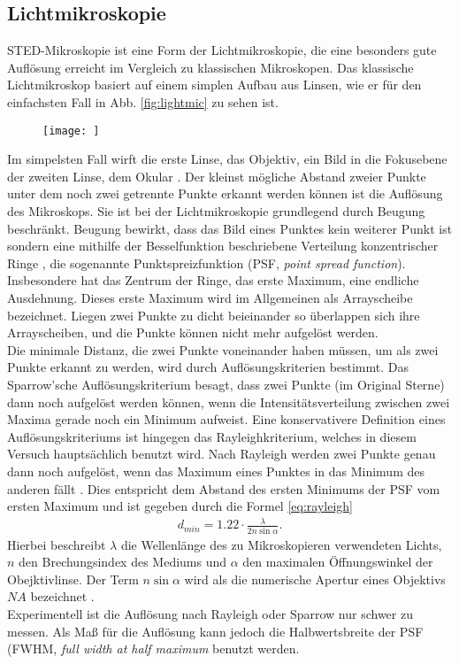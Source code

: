 \subsection{Lichtmikroskopie}
STED-Mikroskopie ist eine Form der Lichtmikroskopie, die eine besonders gute Auflösung erreicht im Vergleich zu klassischen Mikroskopen.
Das klassische Lichtmikroskop basiert auf einem simplen Aufbau aus Linsen, wie er für den einfachsten Fall in Abb. \ref{fig:lightmic} zu sehen ist.
\begin{figure}
	\centering
	\texttt{[image: ]}
\end{figure}
Im simpelsten Fall wirft die erste Linse, das Objektiv, ein Bild in die Fokusebene der zweiten Linse, dem Okular \cite{Dem2}.
Der kleinst mögliche Abstand zweier Punkte unter dem noch zwei getrennte Punkte erkannt werden können ist die Auflösung des Mikroskops.
Sie ist bei der Lichtmikroskopie grundlegend durch Beugung beschränkt.
Beugung bewirkt, dass das Bild eines Punktes kein weiterer Punkt ist sondern eine mithilfe der Besselfunktion beschriebene Verteilung konzentrischer Ringe \cite{Born}, die sogenannte Punktspreizfunktion (PSF, \emph{point spread function}).
Insbesondere hat das Zentrum der Ringe, das erste Maximum, eine endliche Ausdehnung.
Dieses erste Maximum wird im Allgemeinen als Arrayscheibe bezeichnet.
Liegen zwei Punkte zu dicht beieinander so überlappen sich ihre Arrayscheiben, und die Punkte können nicht mehr aufgelöst werden.\\
Die minimale Distanz, die zwei Punkte voneinander haben müssen, um als zwei Punkte erkannt zu werden, wird durch Auflösungskriterien bestimmt.
Das Sparrow'sche Auflösungskriterium \cite{sparrow} besagt, dass zwei Punkte (im Original Sterne) dann noch aufgelöst werden können, wenn die Intensitätsverteilung zwischen zwei Maxima gerade noch ein Minimum aufweist.
Eine konservativere Definition eines Auflösungskriteriums ist hingegen das Rayleighkriterium, welches in diesem Versuch hauptsächlich benutzt wird.
Nach Rayleigh werden zwei Punkte genau dann noch aufgelöst, wenn das Maximum eines Punktes in das Minimum des anderen fällt \cite{Dem2}.
Dies entspricht dem Abstand des ersten Minimums der PSF vom ersten Maximum und ist gegeben durch die Formel \ref{eq:rayleigh}
\begin{align}
	d_{min} = 1.22\cdot \frac{\lambda}{2n\sin \alpha}. \label{eq:rayleigh}
\end{align}
Hierbei beschreibt $\lambda$ die Wellenlänge des zu Mikroskopieren verwendeten Lichts, $n$ den Brechungsindex des Mediums und $\alpha$ den maximalen Öffnungswinkel der Obejktivlinse.
Der Term $n\sin\alpha$ wird als die numerische Apertur eines Objektivs $NA$ bezeichnet \cite{Born}.
\\
Experimentell ist die Auflösung nach Rayleigh oder Sparrow nur schwer zu messen. 
Als Maß für die Auflösung kann jedoch die Halbwertsbreite der PSF (FWHM, \emph{full width at half maximum} benutzt werden. 
